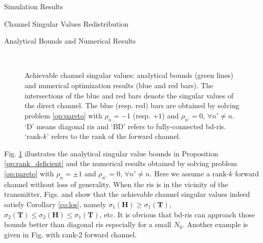 \documentclass[journal]{IEEEtran}
\begin{document}
\begin{section}{Simulation Results}
\begin{subsection}{Channel Singular Values Redistribution}
		\begin{subsubsection}{Analytical Bounds and Numerical Results}
			\begin{figure}[!t]
				\centering
				\\
				\caption{
					Achievable channel singular values: analytical bounds (green lines) and numerical optimization results (blue and red bars).
					The intersections of the blue and red bars denote the singular values of the direct channel.
					The blue (resp. red) bars are obtained by solving problem \eqref{op:pareto} with $\rho_n = -1$ (resp. $+1$) and $\rho_{n'} = 0$, $\forall n' \ne n$.
					`D' means diagonal \gls{ris} and `BD' refers to fully-connected \gls{bd}-\gls{ris}.
					`rank-$k$' refers to the rank of the forward channel.
				}
				\label{fg:singular_bound}
			\end{figure}
			Fig. \ref{fg:singular_bound} illustrates the analytical singular value bounds in Proposition \ref{pp:rank_deficient} and the numerical results obtained by solving problem \eqref{op:pareto} with $\rho_n = \pm 1$ and $\rho_{n'} = 0$, $\forall n' \ne n$.
			Here we assume a rank-$k$ forward channel without loss of generality.
			When the \gls{ris} is in the vicinity of the transmitter, Figs.  and  show that the achievable channel singular values indeed satisfy Corollary \ref{co:los}, namely $\sigma_1(\mathbf{H}) \ge \sigma_1(\mathbf{T})$, $\sigma_2(\mathbf{T}) \le \sigma_2(\mathbf{H}) \le \sigma_1(\mathbf{T})$, etc.
			It is obvious that \gls{bd}-\gls{ris} can approach those bounds better than diagonal \gls{ris} especially for a small $N_\mathrm{S}$.
			Another example is given in Fig.  with rank-2 forward channel.

\end{subsubsection}
\end{subsection}
\end{section}
\end{document}
